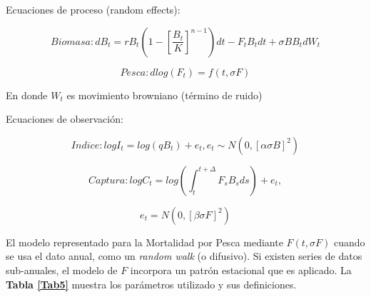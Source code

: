 \documentclass[
  spanish,
]{article}
\begin{document}
Ecuaciones de proceso (random effects):

\begin{equation}
Biomasa: dB_t=rB_t\left(1-\left[\frac{B_t}{K}\right]^{n-1}\right)dt - F_t B_t dt + \sigma BB_tdW_t
\end{equation}

\begin{equation}
Pesca: d log(F_t)=f(t,\sigma F)
\end{equation}

En donde \(W_t\) es movimiento browniano (término de ruido)

Ecuaciones de observación:

\begin{equation}
Indice: logI_t=log(qB_t)+e_t, e_t\sim N\left(0,\left[\alpha \sigma B\right]^2\right)
\end{equation}

\begin{equation}
Captura: logC_t=log\left(\int_{t}^{t+\Delta}F_sB_sds\right)+e_t,
\end{equation}

\begin{equation}
e_t=N\left(0,\left[\beta \sigma F\right]^2\right)
\end{equation}

El modelo representado para la Mortalidad por Pesca mediante
\(F(t,\sigma F)\) cuando se usa el dato anual, como un \emph{random
walk} (o difusivo). Si existen series de datos sub-anuales, el modelo de
\(F\) incorpora un patrón estacional que es aplicado. La
\textbf{Tabla \ref{Tab5}} muestra los parámetros utilizado y sus
definiciones. \vspace{0.5cm}
\end{document}
